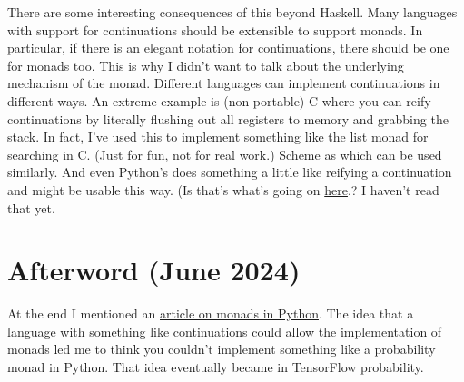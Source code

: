 \documentclass[12pt]{article}
\begin{document}
There are some interesting consequences of this beyond Haskell. Many languages with support for continuations should be extensible to support monads. In particular, if there is an elegant notation for continuations, there should be one for monads too. This is why I didn't want to talk about the underlying mechanism of the  monad. Different languages can implement continuations in different ways. An extreme example is (non-portable) C where you can reify continuations by literally flushing out all registers to memory and grabbing the stack. In fact, I've used this to implement something like the list monad for searching in C. (Just for fun, not for real work.) Scheme as  which can be used similarly. And even Python's  does something a little like reifying a continuation and might be usable this way. (Is that's what's going on \href{http://www.valuedlessons.com/2008/01/monads-in-python-with-nice-syntax.html}{here}.? I haven't read that yet.

\section{Afterword (June 2024)}
At the end I mentioned an \href{http://www.valuedlessons.com/2008/01/monads-in-python-with-nice-syntax.html}{article on monads in Python}.
The idea that a language with something like continuations could allow the implementation of monads led me to think you couldn't implement something like a probability monad in Python. That idea eventually became \href{https://github.com/tensorflow/probability/blob/main/tensorflow_probability/python/distributions/joint_distribution_coroutine.py}{} in TensorFlow probability.
\end{document}
